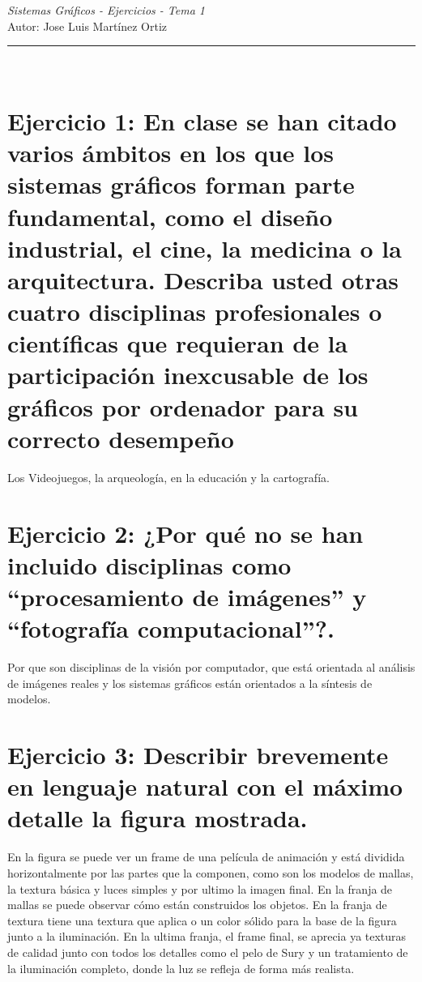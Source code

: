\documentclass[10pt,a4paper,titlepage]{article}
\date{\normalsize\today} %
\newcommand{\horrule}[1]{\rule{\linewidth}{#1}} %
\begin{document}
\begin{center}
{\Huge \emph{Sistemas Gráficos - Ejercicios - Tema 1} } \\
\vspace{0.5cm}
Autor: Jose Luis Martínez Ortiz\\
\horrule{2pt} \\[0.5cm] %
\vspace{1.5cm}
\end{center}


\date{\normalsize\today} %


\section*{Ejercicio 1: En clase se han citado varios ámbitos en los que los sistemas gráficos forman parte
fundamental, como el diseño industrial, el cine, la medicina o la arquitectura. Describa usted
otras cuatro disciplinas profesionales o científicas que requieran de la participación
inexcusable de los gráficos por ordenador para su correcto desempeño}
Los Videojuegos, la arqueología, en la educación y la cartografía.

\section*{Ejercicio 2: ¿Por qué no se han incluido disciplinas como ``procesamiento de imágenes'' y ``fotografía computacional''?.}
Por que son disciplinas de la visión por computador, que está orientada al análisis de imágenes reales y los sistemas gráficos están orientados a la síntesis de modelos.

\section*{Ejercicio 3: Describir brevemente en lenguaje natural con el máximo detalle la figura mostrada.}
En la figura se puede ver un frame de una película de animación y está dividida horizontalmente por las partes que la componen, como son los modelos de mallas, la textura básica y luces simples y por ultimo la imagen final.
En la franja de mallas se puede observar cómo están construidos los objetos. En la franja de textura tiene una textura que aplica o un color sólido para la base de la figura junto a la iluminación. En la ultima franja, el frame final, se aprecia ya texturas de calidad junto con todos los detalles como el pelo de Sury y un tratamiento de la iluminación completo, donde la luz se refleja de forma más realista.
\end{document}
